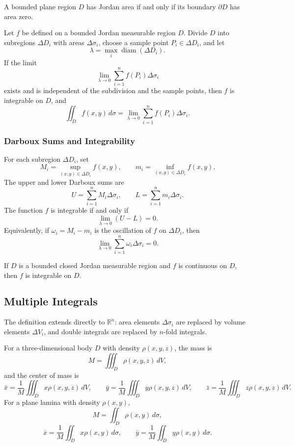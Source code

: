 \begin{theorem}
A bounded plane region $D$ has Jordan area if and only if its boundary $\partial D$ has area zero.
\end{theorem}

\begin{definition}
Let $f$ be defined on a bounded Jordan measurable region $D$. Divide $D$ into subregions $\Delta D_i$ with areas $\Delta\sigma_i$, choose a sample point $P_i\in\Delta D_i$, and let
\[
    \lambda=\max_i\operatorname{diam}(\Delta D_i).
\]
If the limit
\[
    \lim_{\lambda\to0}\sum_{i=1}^n f(P_i)\Delta\sigma_i
\]
exists and is independent of the subdivision and the sample points, then $f$ is integrable on $D$, and
\[
    \iint_D f(x,y)\,d\sigma
    =\lim_{\lambda\to0}\sum_{i=1}^n f(P_i)\Delta\sigma_i.
\]
\end{definition}

\subsubsection{Darboux Sums and Integrability}

For each subregion $\Delta D_i$, set
\[
    M_i=\sup_{(x,y)\in\Delta D_i} f(x,y),
    \qquad
    m_i=\inf_{(x,y)\in\Delta D_i} f(x,y).
\]
The upper and lower Darboux sums are
\[
    U=\sum_{i=1}^n M_i\Delta\sigma_i,
    \qquad
    L=\sum_{i=1}^n m_i\Delta\sigma_i.
\]
The function $f$ is integrable if and only if
\[
    \lim_{\lambda\to0}(U-L)=0.
\]
Equivalently, if $\omega_i=M_i-m_i$ is the oscillation of $f$ on $\Delta D_i$, then
\[
    \lim_{\lambda\to0}\sum_{i=1}^n \omega_i\Delta\sigma_i=0.
\]

\begin{theorem}
If $D$ is a bounded closed Jordan measurable region and $f$ is continuous on $D$, then $f$ is integrable on $D$.
\end{theorem}

\subsection{Multiple Integrals}

The definition extends directly to $\mathbb{R}^n$: area elements $\Delta\sigma_i$ are replaced by volume elements $\Delta V_i$, and double integrals are replaced by $n$-fold integrals.

For a three-dimensional body $D$ with density $\rho(x,y,z)$, the mass is
\[
    M=\iiint_D \rho(x,y,z)\,dV,
\]
and the center of mass is
\[
    \bar{x}=\frac{1}{M}\iiint_D x\rho(x,y,z)\,dV,
    \qquad
    \bar{y}=\frac{1}{M}\iiint_D y\rho(x,y,z)\,dV,
    \qquad
    \bar{z}=\frac{1}{M}\iiint_D z\rho(x,y,z)\,dV.
\]
For a plane lamina with density $\rho(x,y)$,
\[
    M=\iint_D \rho(x,y)\,d\sigma,
\]
\[
    \bar{x}=\frac{1}{M}\iint_D x\rho(x,y)\,d\sigma,
    \qquad
    \bar{y}=\frac{1}{M}\iint_D y\rho(x,y)\,d\sigma.
\]

